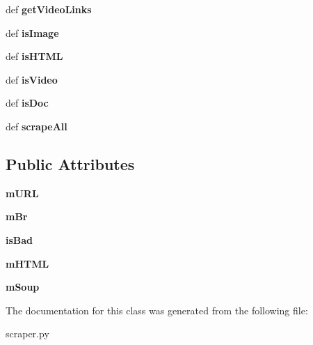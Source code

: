 \begin{DoxyCompactItemize}
\item 
\hypertarget{classscraper_1_1Scraper_ae63e0b5ea4ec1cc3064cd2e28e31f621}{def {\bfseries get\-Video\-Links}}\label{classscraper_1_1Scraper_ae63e0b5ea4ec1cc3064cd2e28e31f621}

\item 
\hypertarget{classscraper_1_1Scraper_a32bb04eaccdbc4454abce1c0c9d35f83}{def {\bfseries is\-Image}}\label{classscraper_1_1Scraper_a32bb04eaccdbc4454abce1c0c9d35f83}

\item 
\hypertarget{classscraper_1_1Scraper_a245a169624f9f15cda984a14991f97c3}{def {\bfseries is\-H\-T\-M\-L}}\label{classscraper_1_1Scraper_a245a169624f9f15cda984a14991f97c3}

\item 
\hypertarget{classscraper_1_1Scraper_a22409df33f2fc96dd98423fac62c3dd7}{def {\bfseries is\-Video}}\label{classscraper_1_1Scraper_a22409df33f2fc96dd98423fac62c3dd7}

\item 
\hypertarget{classscraper_1_1Scraper_a8802a7af811f59d1a6980b588dc409bf}{def {\bfseries is\-Doc}}\label{classscraper_1_1Scraper_a8802a7af811f59d1a6980b588dc409bf}

\item 
\hypertarget{classscraper_1_1Scraper_a1e5e5e16c03a9ee6709ed10da0dc75a1}{def {\bfseries scrape\-All}}\label{classscraper_1_1Scraper_a1e5e5e16c03a9ee6709ed10da0dc75a1}

\end{DoxyCompactItemize}
\subsection*{Public Attributes}
\begin{DoxyCompactItemize}
\item 
\hypertarget{classscraper_1_1Scraper_a36a864803714a033657ef8c9f8a1c181}{{\bfseries m\-U\-R\-L}}\label{classscraper_1_1Scraper_a36a864803714a033657ef8c9f8a1c181}

\item 
\hypertarget{classscraper_1_1Scraper_a29f1b1abf2adaea2fe782622748a00df}{{\bfseries m\-Br}}\label{classscraper_1_1Scraper_a29f1b1abf2adaea2fe782622748a00df}

\item 
\hypertarget{classscraper_1_1Scraper_a72e792b3ed75c00315b515da29244a37}{{\bfseries is\-Bad}}\label{classscraper_1_1Scraper_a72e792b3ed75c00315b515da29244a37}

\item 
\hypertarget{classscraper_1_1Scraper_ac5b7229df7b2f0589ea1fe8651e71cc1}{{\bfseries m\-H\-T\-M\-L}}\label{classscraper_1_1Scraper_ac5b7229df7b2f0589ea1fe8651e71cc1}

\item 
\hypertarget{classscraper_1_1Scraper_a97c7efed94f7b2119db66b52cc749457}{{\bfseries m\-Soup}}\label{classscraper_1_1Scraper_a97c7efed94f7b2119db66b52cc749457}

\end{DoxyCompactItemize}


The documentation for this class was generated from the following file\-:\begin{DoxyCompactItemize}
\item 
scraper.\-py\end{DoxyCompactItemize}
